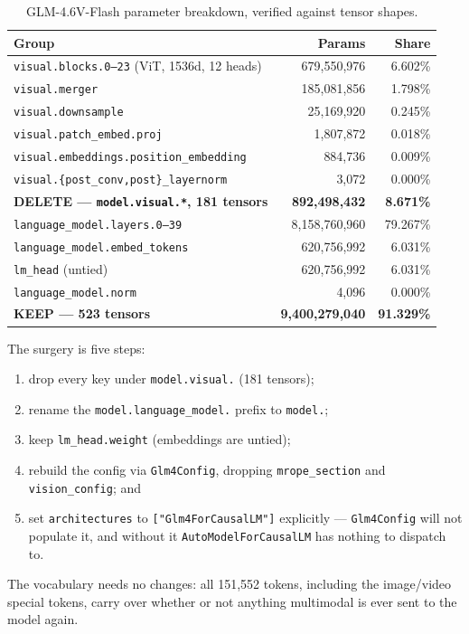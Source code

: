 \documentclass[11pt]{article}
\begin{document}
\begin{table}[h]
\centering
\small
\begin{tabular}{lrr}
\toprule
Group & Params & Share \\
\midrule
\texttt{visual.blocks.0--23} (ViT, 1536d, 12 heads) & 679,550,976 & 6.602\% \\
\texttt{visual.merger} & 185,081,856 & 1.798\% \\
\texttt{visual.downsample} & 25,169,920 & 0.245\% \\
\texttt{visual.patch\_embed.proj} & 1,807,872 & 0.018\% \\
\texttt{visual.embeddings.position\_embedding} & 884,736 & 0.009\% \\
\texttt{visual.\{post\_conv,post\}\_layernorm} & 3,072 & 0.000\% \\
\midrule
\textbf{DELETE --- \texttt{model.visual.*}, 181 tensors} & \textbf{892,498,432} & \textbf{8.671\%} \\
\texttt{language\_model.layers.0--39} & 8,158,760,960 & 79.267\% \\
\texttt{language\_model.embed\_tokens} & 620,756,992 & 6.031\% \\
\texttt{lm\_head} (untied) & 620,756,992 & 6.031\% \\
\texttt{language\_model.norm} & 4,096 & 0.000\% \\
\midrule
\textbf{KEEP --- 523 tensors} & \textbf{9,400,279,040} & \textbf{91.329\%} \\
\bottomrule
\end{tabular}
\caption{GLM-4.6V-Flash parameter breakdown, verified against tensor shapes.}
\end{table}

The surgery is five steps:
\begin{enumerate}[nosep,leftmargin=1.5em]
\item drop every key under \texttt{model.visual.} (181 tensors);
\item rename the \texttt{model.language\_model.} prefix to \texttt{model.};
\item keep \texttt{lm\_head.weight} (embeddings are untied);
\item rebuild the config via \texttt{Glm4Config}, dropping \texttt{mrope\_section} and
  \texttt{vision\_config}; and
\item set \texttt{architectures} to \texttt{["Glm4ForCausalLM"]} explicitly ---
  \texttt{Glm4Config} will not populate it, and without it
  \texttt{AutoModelForCausalLM} has nothing to dispatch to.
\end{enumerate}
The vocabulary needs no changes: all 151,552 tokens, including the image/video special
tokens, carry over whether or not anything multimodal is ever sent to the model again.
\end{document}
